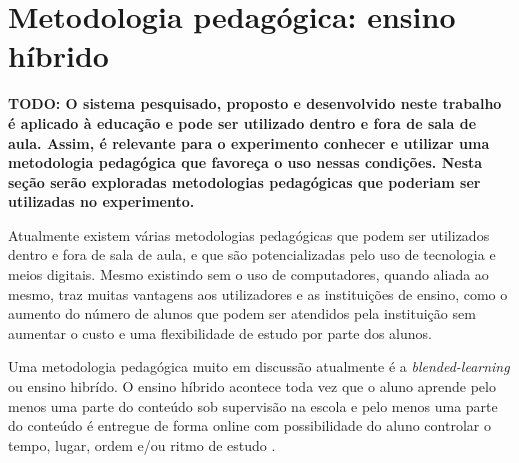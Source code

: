 

\section{Metodologia pedagógica: ensino híbrido}
\label{sec:flipped}


\textbf{TODO: O sistema pesquisado, proposto e desenvolvido neste trabalho é aplicado à educação e pode ser utilizado dentro e fora de sala de aula. Assim, é relevante para o experimento conhecer e utilizar uma metodologia pedagógica que favoreça o uso nessas condições. Nesta seção serão exploradas metodologias pedagógicas que poderiam ser utilizadas no experimento.}

Atualmente existem várias metodologias pedagógicas que podem ser utilizados dentro e fora de sala de aula, e que são potencializadas pelo uso de tecnologia e meios digitais. Mesmo existindo sem o uso de computadores, quando aliada ao mesmo, traz muitas vantagens aos utilizadores e as instituições de ensino, como o aumento do número de alunos que podem ser atendidos pela instituição sem aumentar o custo e uma flexibilidade de estudo por parte dos alunos. 

Uma metodologia pedagógica muito em discussão atualmente é a \emph{blended-learning} ou ensino hibrído. O ensino híbrido acontece toda vez que o aluno aprende pelo menos uma parte do conteúdo sob supervisão na escola e pelo menos uma parte do conteúdo é entregue de forma online com possibilidade do aluno controlar o tempo, lugar, ordem e/ou ritmo de estudo \cite{horn_rise_2011}.


